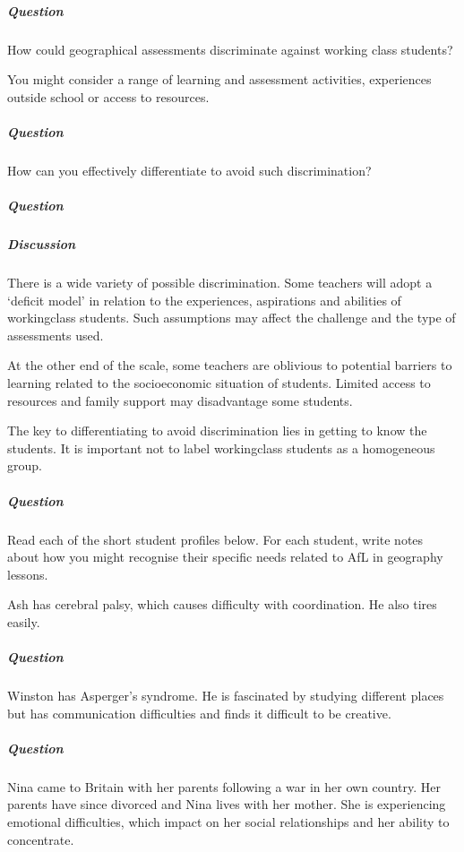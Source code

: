 \documentclass[letterpaper,10pt,english]{sphinxmanual}
\begin{document}
\subparagraph{Question}
\label{\detokenize{content/session_00/Part_00_04:Question}}
How could geographical assessments discriminate against working class students?

You might consider a range of learning and assessment activities, experiences outside school or access to resources.


\subparagraph{Question}
\label{\detokenize{content/session_00/Part_00_04:id1}}
How can you effectively differentiate to avoid such discrimination?


\subparagraph{Question}
\label{\detokenize{content/session_00/Part_00_04:id2}}

\subparagraph{Discussion}
\label{\detokenize{content/session_00/Part_00_04:Discussion}}
There is a wide variety of possible discrimination. Some teachers will adopt a ‘deficit model’ in relation to the experiences, aspirations and abilities of working\sphinxhyphen{}class students. Such assumptions may affect the challenge and the type of assessments used.

At the other end of the scale, some teachers are oblivious to potential barriers to learning related to the socio\sphinxhyphen{}economic situation of students. Limited access to resources and family support may disadvantage some students.

The key to differentiating to avoid discrimination lies in getting to know the students. It is important not to label working\sphinxhyphen{}class students as a homogeneous group.


\subparagraph{Question}
\label{\detokenize{content/session_00/Part_00_04:id3}}
Read each of the short student profiles below. For each student, write notes about how you might recognise their specific needs related to AfL in geography lessons.

Ash has cerebral palsy, which causes difficulty with coordination. He also tires easily.


\subparagraph{Question}
\label{\detokenize{content/session_00/Part_00_04:id4}}
Winston has Asperger’s syndrome. He is fascinated by studying different places but has communication difficulties and finds it difficult to be creative.


\subparagraph{Question}
\label{\detokenize{content/session_00/Part_00_04:id5}}
Nina came to Britain with her parents following a war in her own country. Her parents have since divorced and Nina lives with her mother. She is experiencing emotional difficulties, which impact on her social relationships and her ability to concentrate.
\end{document}
